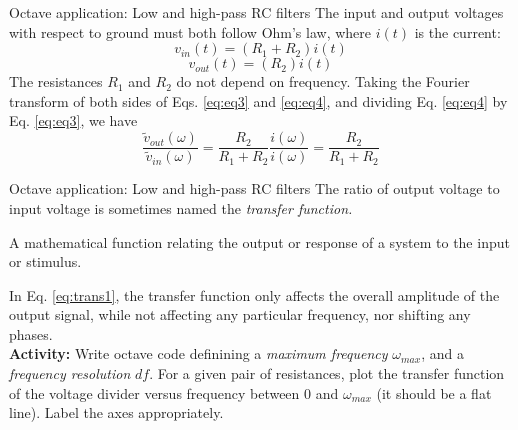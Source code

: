 \documentclass{beamer}
\begin{document}
\begin{frame}{Octave application: Low and high-pass RC filters}
\small
The input and output voltages with respect to ground must both follow Ohm's law, where $i(t)$ is the current:
\begin{equation}
v_{in} (t) = (R_1 + R_2)i(t)
\label{eq:eq3}
\end{equation}
\begin{equation}
v_{out} (t) = (R_2)i(t)
\label{eq:eq4}
\end{equation}
The resistances $R_1$ and $R_2$ do not depend on frequency.  Taking the Fourier transform of both sides of Eqs. \ref{eq:eq3} and \ref{eq:eq4}, and dividing Eq. \ref{eq:eq4} by Eq. \ref{eq:eq3}, we have
\begin{equation}
\boxed{
\frac{\tilde{v}_{out}(\omega)}{\tilde{v}_{in}(\omega)} = \frac{R_2}{R_1+R_2} \frac{i(\omega)}{i(\omega)} = \frac{R_2}{R_1+R_2}
}
\label{eq:trans1}
\end{equation}
\end{frame}

\begin{frame}{Octave application: Low and high-pass RC filters}
\small
The ratio of output voltage to input voltage is sometimes named the \textit{transfer function.} \\ \vspace{0.5cm}
\begin{tcolorbox}[colback=white,colframe=red!40!blue,title=Transfer function]
\alert{A mathematical function relating the output or response of a system to the input or stimulus.}
\end{tcolorbox}
In Eq. \ref{eq:trans1}, the transfer function only affects the overall amplitude of the output signal, while not affecting any particular frequency, nor shifting any phases. \\ \vspace{0.5cm}
\textbf{Activity:} Write octave code definining a \textit{maximum frequency} $\omega_{max}$, and a \textit{frequency resolution} $df$. For a given pair of resistances, plot the transfer function of the voltage divider versus frequency between $0$ and $\omega_{max}$ (it should be a flat line). Label the axes appropriately.
\end{frame}
\end{document}

